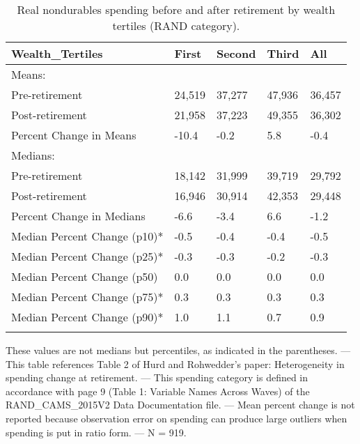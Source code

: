 \begin{table}[tbp] \centering
{}

\caption{Real nondurables spending before and after retirement by wealth tertiles (RAND category).}
\begin{tabularx}{\textwidth}{lCCCC}

\toprule
{Wealth\_Tertiles}&{First}&{Second}&{Third}&{All} \tabularnewline
\midrule\addlinespace[1.5ex]
Means:&&&& \tabularnewline
\midrule Pre-retirement&24,519&37,277&47,936&36,457 \tabularnewline
Post-retirement&21,958&37,223&49,355&36,302 \tabularnewline
Percent Change in Means&-10.4&-0.2&5.8&-0.4 \tabularnewline
\midrule Medians:&&&& \tabularnewline
\midrule Pre-retirement&18,142&31,999&39,719&29,792 \tabularnewline
Post-retirement&16,946&30,914&42,353&29,448 \tabularnewline
Percent Change in Medians&-6.6&-3.4&6.6&-1.2 \tabularnewline
Median Percent Change (p10)*&-0.5&-0.4&-0.4&-0.5 \tabularnewline
Median Percent Change (p25)*&-0.3&-0.3&-0.2&-0.3 \tabularnewline
Median Percent Change (p50)&0.0&0.0&0.0&0.0 \tabularnewline
Median Percent Change (p75)*&0.3&0.3&0.3&0.3 \tabularnewline
Median Percent Change (p90)*&1.0&1.1&0.7&0.9 \tabularnewline
\bottomrule \addlinespace[1.5ex]

\end{tabularx}
\begin{flushleft}
\footnotesize *These values are not medians but percentiles, as indicated in the parentheses. \linebreak --- \linebreak This table references Table 2 of Hurd and Rohwedder's paper: Heterogeneity in spending change at retirement. \linebreak --- \linebreak This spending category is defined in accordance with page 9 (Table 1: Variable Names Across Waves) of the RAND\_CAMS\_2015V2 Data Documentation file. \linebreak --- \linebreak Mean percent change is not reported because observation error on spending can produce large outliers when spending is put in ratio form. \linebreak --- \linebreak N = 919.
\end{flushleft}
\end{table}

